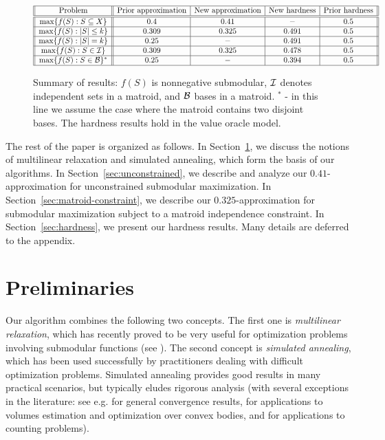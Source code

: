 \documentclass{article}[11pt]
\def\cI{{\cal I}}
\def\cB{{\cal B}}
\def\max{{\rm{max}}}
\begin{document}
\begin{figure}[here]
$\begin{array}{|| c || c | c | c | c ||} \hline
\mbox{Problem} & \mbox{Prior approximation} & \mbox{New approximation}
 & \mbox{New hardness} & \mbox{Prior hardness}  \\
\hline \hline
\max \{f(S): S \subseteq X \} & 0.4 & 0.41 & - & 0.5 \\
\hline
\max \{f(S): |S| \leq k \} & 0.309 & 0.325 & 0.491 & 0.5 \\
\hline
\max \{f(S): |S|=k \} & 0.25 & - & 0.491 & 0.5 \\
\hline
\max \{f(S): S \in \cI \} & 0.309 & 0.325 & 0.478 & 0.5 \\
\hline
\max \{f(S): S \in \cB \}^* & 0.25 & - & 0.394 & 0.5 \\
\hline
\end{array} $
\caption{Summary of results: $f(S)$ is nonnegative submodular,
$\cI$ denotes independent sets in a matroid, and
$\cB$ bases in a matroid. $^*$ - in this line we assume the case
where the matroid contains two disjoint bases.
The hardness results hold in the value oracle model.}
\end{figure}


The rest of the paper is organized as follows. In Section~\ref{sec:prelims},
we discuss the notions of multilinear relaxation and simulated annealing,
which form the basis of our algorithms. In Section~\ref{sec:unconstrained},
we describe and analyze our $0.41$-approximation for unconstrained submodular
maximization. In Section~\ref{sec:matroid-constraint}, we describe
our $0.325$-approximation for submodular maximization subject to a matroid
independence constraint. In Section~\ref{sec:hardness},
we present our hardness results.
Many details are deferred to the appendix.


\section{Preliminaries}
\label{sec:prelims}

Our algorithm combines the following two concepts. The first one is
{\em multilinear relaxation}, which has recently proved to be
very useful for optimization problems involving submodular functions
(see \cite{CCPV07,Vondrak08,CCPV09,KST09,LMNS09,Vondrak09}).
The second concept is {\em simulated annealing},
which has been used successfully by practitioners dealing with difficult optimization problems.
Simulated annealing provides good results in many practical scenarios, but typically
eludes rigorous analysis (with several exceptions in the literature:
see e.g. \cite{BT93} for general convergence results, 
\cite{LV03,KV06} for applications to volumes estimation and optimization over convex bodies,
and \cite{SVV07,BSVV08} for applications to counting problems).
\end{document}
